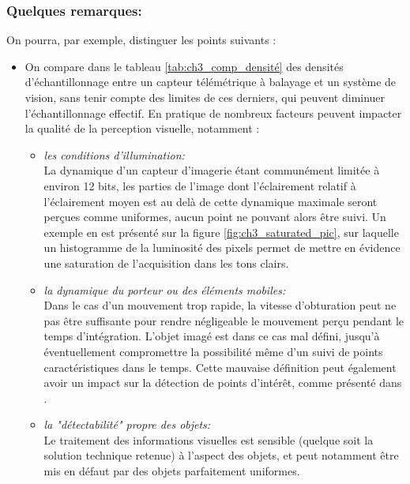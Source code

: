 \subsubsection{Quelques remarques:}
On pourra, par exemple, distinguer les points suivants :
\begin{itemize}
	\item On compare dans le tableau \ref{tab:ch3_comp_densité} des densités d'échantillonnage entre un capteur télémétrique à balayage et un système de vision, sans tenir compte des limites de ces derniers, qui peuvent diminuer l'échantillonnage effectif. En pratique de nombreux facteurs peuvent impacter la qualité de la perception visuelle, notamment : \\
	
		\begin{itemize} \renewcommand{\labelitemii}{$\cdot$}
			\item{\emph{les conditions d'illumination:\\}}
			La dynamique d'un capteur d'imagerie étant communément limitée à environ 12 bits, les parties de l'image dont l'éclairement relatif à l'éclairement moyen est au delà de cette dynamique maximale seront perçues comme uniformes, aucun point ne pouvant alors être suivi. Un exemple en est présenté sur la figure \ref{fig:ch3_saturated_pic}, sur laquelle un histogramme de la luminosité des pixels permet de mettre en évidence une saturation de l'acquisition dans les tons clairs.\\
			
			\item{\emph{la dynamique du porteur ou des éléments mobiles:\\}}
			Dans le cas d'un mouvement trop rapide, la vitesse d'obturation peut ne pas être suffisante pour rendre négligeable le mouvement perçu pendant le temps d'intégration. L'objet imagé est dans ce cas mal défini, jusqu'à éventuellement compromettre la possibilité même d'un suivi de points caractéristiques dans le temps. Cette mauvaise définition peut également avoir un impact sur la détection de points d'intérêt, comme présenté dans \cite{Mei2010}.\\
			
			\item{\emph{la "détectabilité" propre des objets:\\}}
			Le traitement des informations visuelles est sensible (quelque soit la solution technique retenue) à l'aspect des objets, et peut notamment être mis en défaut par des objets parfaitement uniformes.\\
		\end{itemize}


\end{itemize}
